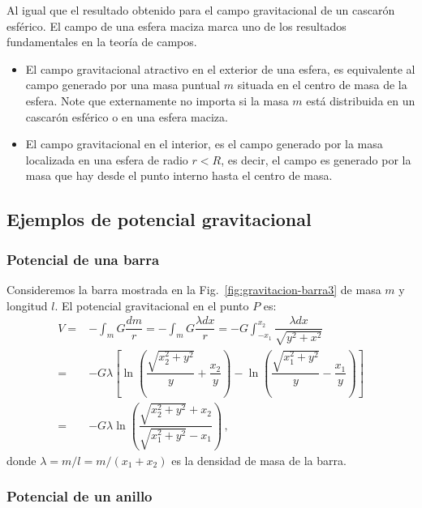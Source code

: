 Al igual que el resultado obtenido para el campo gravitacional de un cascarón esférico. El campo de una esfera maciza marca uno de los resultados fundamentales en la teoría de campos. 
\begin{itemize}
\item El campo gravitacional atractivo en el exterior de una esfera, es equivalente al campo generado por una masa puntual $m$ situada en el centro de masa de la esfera. Note que externamente no importa si la masa $m$ está distribuida en un cascarón esférico o en una esfera maciza.
\item El campo gravitacional en el interior, es el campo generado por la masa localizada en una esfera de radio $r < R$, es decir, el campo es generado por la masa que hay desde el punto interno hasta el centro de masa. 
\end{itemize}






\subsection{Ejemplos de potencial gravitacional}


\subsubsection{Potencial de una barra}
Consideremos la barra mostrada en la Fig.~\ref{fig:gravitacion-barra3} de masa $m$ y longitud $l$. El potencial gravitacional en el punto $P$ es:
\begin{align}
V=&-\int_m G\dfrac{dm}{r} = -\int_m G \dfrac{\lambda dx}{r}
=-G\int_{-x_1}^{x_2}\dfrac{\lambda dx}{\sqrt{y^2+x^2}}\nonumber\\
=& -G\lambda \left[\ln\left(\dfrac{\sqrt{x_2^2+y^2}}{y}+\dfrac{x_2}{y}\right)-\ln\left(\dfrac{\sqrt{x_1^2+y^2}}{y}-\dfrac{x_1}{y}\right)\right]\nonumber\\
=& -G\lambda \ln\left(\dfrac{\sqrt{x_2^2+y^2}+x_2}{\sqrt{x_1^2+y^2}-x_1}\right)\,,
\label{ec:potencial-gravitacinal-barra}
\end{align}
donde $\lambda=m/l=m/(x_1+x_2)$ es la densidad de masa de la barra.




\subsubsection{Potencial de un anillo}

